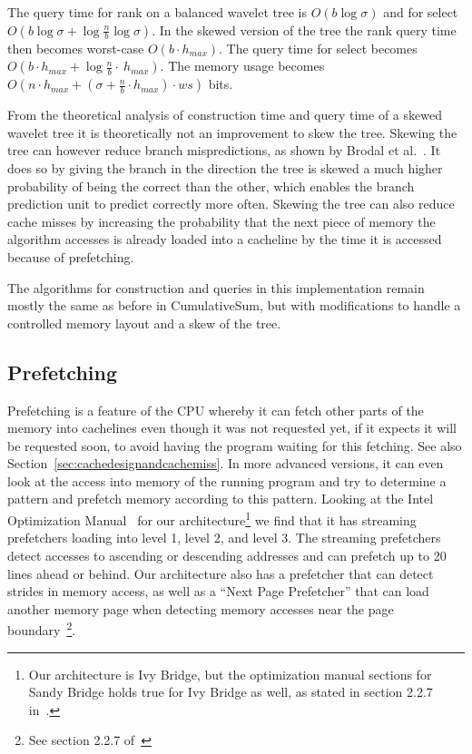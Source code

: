 The query time for rank on a balanced wavelet tree is $O(b \log \sigma)$ and for select $O(b \log \sigma + \log \frac{n}{b} \log \sigma)$.
In the skewed version of the tree the rank query time then becomes worst-case $O(b \cdot h_{max})$. The query time for select becomes $O(b \cdot h_{max} + \log \frac{n}{b} \cdot~h_{max})$.
The memory usage becomes 
$O(n \cdot h_{max} + (\sigma + \frac{n}{b} \cdot h_{max}) \cdot \mathit{ws})$ bits.


From the theoretical analysis of construction time and query time of a skewed wavelet tree it is theoretically not an improvement to skew the tree.
Skewing the tree can however reduce branch mispredictions, as shown by Brodal et al.~.
It does so by giving the branch in the direction the tree is skewed a much higher probability of being the correct than the other, which enables the branch prediction unit to predict correctly more often. 
Skewing the tree can also reduce cache misses by increasing the probability that the next piece of memory the algorithm accesses is already loaded into a cacheline by the time it is accessed because of prefetching.

The algorithms for construction and queries in this implementation remain mostly the same as before in CumulativeSum, but with modifications to handle a controlled memory layout and a skew of the tree.

\subsection{Prefetching}
Prefetching is a feature of the CPU whereby it can fetch other parts of the memory into cachelines even though it was not requested yet, if it expects it will be requested soon, to avoid having the program waiting for this fetching.
See also Section~\ref{sec:cachedesignandcachemiss}.
In more advanced versions, it can even look at the access into memory of the running program and try to determine a pattern and prefetch memory according to this pattern.
Looking at the Intel Optimization Manual~ for our architecture\footnote{Our architecture is Ivy Bridge, but the optimization manual sections for Sandy Bridge holds true for Ivy Bridge as well, as stated in section 2.2.7 in~.} we find that it has streaming prefetchers loading into level 1, level 2, and level 3. The streaming prefetchers detect accesses to ascending or descending addresses and can prefetch up to 20 lines ahead or behind. 
Our architecture also has a prefetcher that can detect strides in memory access, as well as a “Next Page Prefetcher” that can load another memory page when detecting memory accesses near the page boundary~\footnote{See section 2.2.7 of~}.


